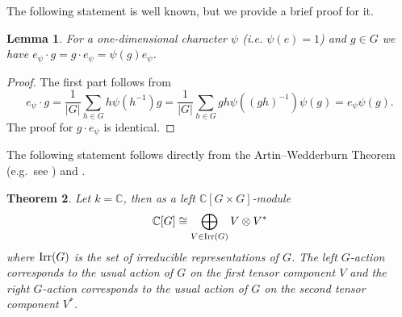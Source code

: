 \documentclass[12pt,reqno]{amsart}
\newtheorem{thm}{Theorem}[section]
\newtheorem{lem}[thm]{Lemma}
\theoremstyle{definition}
\theoremstyle{remark}
\numberwithin{equation}{section}
\newcommand{\CC}{\mathbb{C}}
\DeclareMathOperator{\End}{End}
\def\IM#1{\textcolor[rgb]{0.00,0.00,0.75}{[I: #1]}}
\begin{document}
The following statement is well known, but we provide a brief proof for it.
\begin{lem}\label{Epsi*U}
    For a one-dimensional character $\psi$ (i.e. $\psi(e)=1$) and $g\in G$ we have $e_\psi \cdot g = g \cdot e_\psi = \psi(g) e_\psi$.
\end{lem}

\begin{proof} The first part follows from
    \begin{equation*}
        e_\psi \cdot g = \frac{1}{|G|} \sum_{h \in G} h \psi(h^{-1})g
        = \frac{1}{|G|} \sum_{h \in G} gh \psi((gh)^{-1}) \psi(g)
        = e_\psi \psi(g).
    \end{equation*}
    The proof for $g \cdot e_\psi$ is identical.
\end{proof}

The following statement follows directly from the Artin–Wedderburn Theorem (e.g.~see \cite[Theorem 4.1.1]{E}) and \cite[Section 6, Proposition 11]{Serre}. %

\begin{thm}\label{AMT} Let $k=\CC$, then as a left $\CC[G\times G]$-module
\begin{equation}\label{Bimod_decomp}
    \CC[G]\cong \bigoplus_{V\in {\rm Irr} (G)} V\otimes V^{*}
\end{equation}
where ${\rm Irr}(G)$ is the set of irreducible representations of $G$. The left $G$-action corresponds to the usual action of $G$ on the first tensor component $V$ and the right $G$-action corresponds to the usual action of $G$ on the second tensor component $V^*$.\\
\end{thm}

\end{document}
